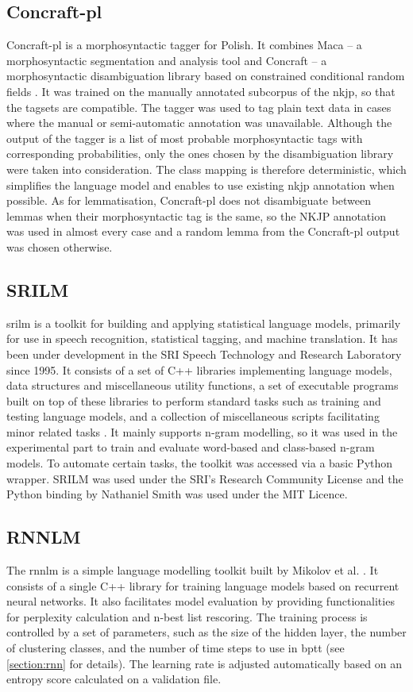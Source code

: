 \subsection{Concraft-pl}
Concraft-pl is a morphosyntactic tagger for Polish. It combines Maca -- a morphosyntactic segmentation and analysis tool and Concraft -- a morphosyntactic disambiguation library based on constrained conditional random fields \cite{waszczuk2012harnessing}. It was trained on the manually annotated subcorpus of the \gls{nkjp}, so that the tagsets are compatible. The tagger was used to tag plain text data in cases where the manual or semi-automatic annotation was unavailable. Although the output of the tagger is a list of most probable morphosyntactic tags with corresponding probabilities, only the ones chosen by the disambiguation library were taken into consideration. The class mapping is therefore deterministic, which simplifies the language model and enables to use existing \gls{nkjp} annotation when possible. As for lemmatisation, Concraft-pl does not disambiguate between lemmas when their morphosyntactic tag is the same, so the NKJP annotation was used in almost every case and a random lemma from the Concraft-pl output was chosen otherwise.

\subsection{SRILM}
\gls{srilm} is a toolkit for building and applying statistical language models, primarily for use in speech recognition, statistical tagging, and machine translation. It has been under development in the SRI Speech Technology and Research Laboratory since 1995. It consists of a set of C++ libraries implementing language models, data structures and miscellaneous utility functions, a set of executable programs built on top of these libraries to perform standard tasks such as training and testing language models, and a collection of miscellaneous scripts facilitating minor related tasks \cite{stolcke2011srilm}. It mainly supports n-gram modelling, so it was used in the experimental part to train and evaluate \mbox{word-based} and \mbox{class-based} \mbox{n-gram} models. To automate certain tasks, the toolkit was accessed via a basic Python wrapper. SRILM was used under the SRI's Research Community License and the Python binding by Nathaniel Smith was used under the MIT Licence.
\subsection{RNNLM}
The \gls{rnnlm} is a simple language modelling toolkit built by Mikolov et al. \cite{mikolov2011extensions}. It consists of a single C++ library for training language models based on recurrent neural networks. It also facilitates model evaluation by providing functionalities for perplexity calculation and n-best list rescoring. The training process is controlled by a set of parameters, such as the size of the hidden layer, the number of clustering classes, and the number of time steps to use in \gls{bptt} (see \ref{section:rnn} for details). The learning rate is adjusted automatically based on an entropy score calculated on a validation file.
